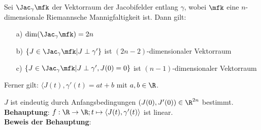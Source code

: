 \begin{lem}

Sei $\Jac_\gamma \mfk$ der Vektorraum der Jacobifelder entlang $\gamma$, wobei 
$\mfk$ eine $n$-dimensionale Riemannsche Mannigfaltigkeit ist.
Dann gilt:
\begin{itemize}
\item[a)] $\dim (\Jac_\gamma \mfk) = 2n$
\item[b)] $\{ J \in \Jac_\gamma \mfk \vert J \perp \gamma' \}$ ist 
    $(2n-2)$-dimensionaler Vektorraum
\item[c)] $\{ J \in \Jac_\gamma \mfk \vert J \perp \gamma' , J(0)=0\}$ ist 
    $(n-1)$-dimensionaler Vektorraum
\end{itemize}
Ferner gilt: $\langle J(t) , \gamma'(t) = at + b$ mit $a,b \in \R$.
\end{lem}
\begin{bew}
$J$ ist eindeutig durch Anfangsbedingungen $(J(0),J'(0))\in\R^{2n}$ bestimmt.\\
\textbf{Behauptung}: $f: \R\to\R; t \mapsto \langle J(t) , \gamma'(t)\rangle$
ist linear.\\
\textbf{Beweis der Behauptung}:


\end{bew}







